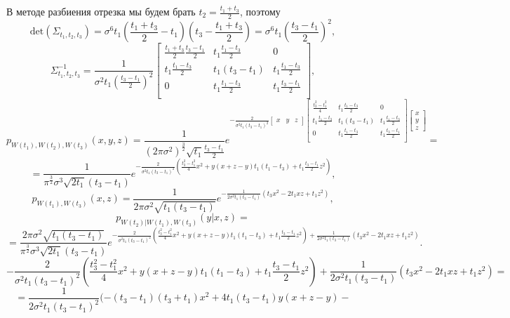 \documentclass{article}
\theoremstyle{definition}
\begin{document}
В методе разбиения отрезка мы будем брать $t_2 = \frac{t_1 + t_3}{2}$, поэтому
$$\text{det}(\Sigma_{t_1, t_2, t_3}) = \sigma^6t_1(\frac{t_1 + t_3}{2} - t_1)(t_3 - \frac{t_1 + t_3}{2}) = \sigma^6t_1\left(\frac{t_3 - t_1}{2}\right)^2,$$
$$\Sigma_{t_1, t_2, t_3}^{-1} = \frac{1}{\sigma^2t_1\left(\frac{t_3 - t_1}{2}\right)^2}\begin{bmatrix}
\frac{t_1 + t_3}{2}\frac{t_3 - t_1}{2} & t_1\frac{t_1 - t_3}{2} & 0\\
t_1\frac{t_1 - t_3}{2} & t_1(t_3 - t_1) & t_1\frac{t_1 - t_3}{2}\\
0 & t_1\frac{t_1 - t_3}{2} & t_1\frac{t_3 - t_1}{2}\\
\end{bmatrix},$$
$$p_{W(t_1),W(t_2),W(t_3)}(x,y,z) = \frac{1}{\left(2\pi\sigma^2\right)^{\frac{3}{2}}\sqrt{t_1}\frac{t_3 - t_1}{2}}e^{-\frac{2}{\sigma^2t_1(t_3 - t_1)^2}\begin{bmatrix}x & y & z\end{bmatrix}\begin{bmatrix}
\frac{t_3^2 - t_1^2}{4} & t_1\frac{t_1 - t_3}{2} & 0\\
t_1\frac{t_1 - t_3}{2} & t_1(t_3 - t_1) & t_1\frac{t_1 - t_3}{2}\\
0 & t_1\frac{t_1 - t_3}{2} & t_1\frac{t_3 - t_1}{2}\\
\end{bmatrix}\begin{bmatrix}x \\ y \\ z\end{bmatrix}} = $$
$$
 = \frac{1}{\pi^{\frac{3}{2}}\sigma^3\sqrt{2 t_1}(t_3 - t_1)}e^{-\frac{2}{\sigma^2t_1(t_3 - t_1)^2}\left(\frac{t_3^2 - t_1^2}{4}x^2 + y(x + z - y)t_1(t_1 - t_3) + t_1\frac{t_3 - t_1}{2}z^2\right)},
$$
$$
p_{W(t_1), W(t_3)}(x, z) = \frac{1}{2\pi \sigma^2 \sqrt{t_1(t_3-t_1)}}e^{-\frac{1}{2\sigma^2t_1(t_3-t_1)}(t_3x^2 - 2t_1xz + t_1z^2)},
$$
$$p_{W(t_2)|W(t_1),W(t_3)}(y|x,z) = $$
$$ =\frac{2\pi \sigma^2 \sqrt{t_1(t_3-t_1)}}{\pi^{\frac{3}{2}}\sigma^3\sqrt{2 t_1}(t_3 - t_1)}e^{-\frac{2}{\sigma^2t_1(t_3 - t_1)^2}\left(\frac{t_3^2 - t_1^2}{4}x^2 + y(x + z - y)t_1(t_1 - t_3) + t_1\frac{t_3 - t_1}{2}z^2\right) + \frac{1}{2\sigma^2t_1(t_3-t_1)}(t_3x^2 - 2t_1xz + t_1z^2)}.$$
$$ -\frac{2}{\sigma^2t_1(t_3 - t_1)^2}\left(\frac{t_3^2 - t_1^2}{4}x^2 + y(x + z - y)t_1(t_1 - t_3) + t_1\frac{t_3 - t_1}{2}z^2\right) + \frac{1}{2\sigma^2t_1(t_3-t_1)}(t_3x^2 - 2t_1xz + t_1z^2) = $$
$$ = \frac{1}{2\sigma^2t_1(t_3 - t_1)^2}(-(t_3 - t_1)(t_3 + t_1)x^2 + 4t_1(t_3 - t_1)y(x + z - y) - $$
\end{document}

